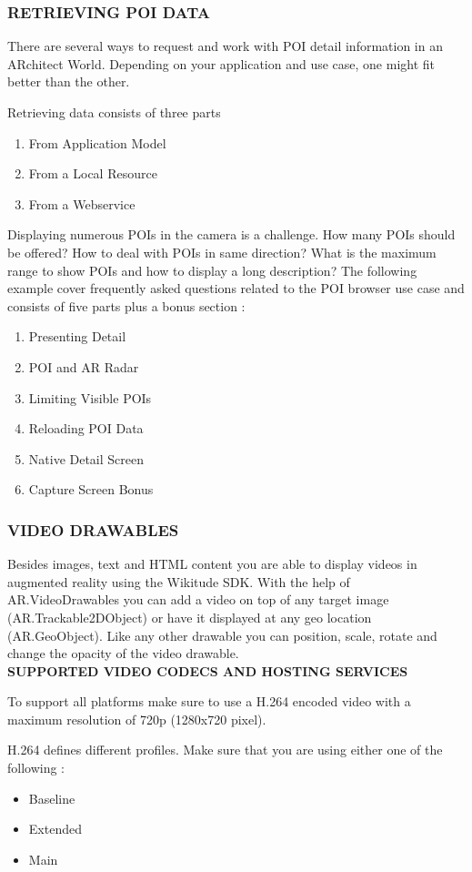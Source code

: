 \documentclass{article}
\begin{document}
\subsubsection{RETRIEVING POI DATA }
\par There are several ways to request and work with POI detail information in an ARchitect World. Depending on your application and use case, one might fit better than the other. 
\par Retrieving data consists of three parts 
\begin{enumerate}
\item From Application Model
\item From a Local Resource 
\item From a Webservice
\end{enumerate}
\par Displaying numerous POIs in the camera is a challenge. How many POIs should be offered? How to deal with POIs in same direction? What is the maximum range to show POIs and how to display a long description? The following example cover frequently asked questions related to the POI browser use case and consists of five parts plus a bonus section :
\begin{enumerate}
\item  Presenting Detail
\item POI and AR Radar 
\item  Limiting Visible POIs 
\item Reloading POI Data
\item  Native Detail Screen 
\item Capture Screen Bonus 
\end{enumerate}

\subsubsection{VIDEO DRAWABLES }
\par Besides images, text and HTML content you are able to display videos in augmented reality using the Wikitude SDK. With the help of AR.VideoDrawables you can add a video on top of any target image (AR.Trackable2DObject) or have it displayed at any geo location (AR.GeoObject). Like any other drawable you can position, scale, rotate and change the opacity of the video drawable.\\[.4cm]
\textbf{SUPPORTED VIDEO CODECS AND HOSTING SERVICES }
\par To support all platforms make sure to use a H.264 encoded video with a maximum resolution of 720p (1280x720 pixel). 
\par H.264 defines different profiles. Make sure that you are using either one of the following :
\begin{itemize}
\item Baseline 
\item Extended 
\item Main 
\end{itemize}
\end{document}
